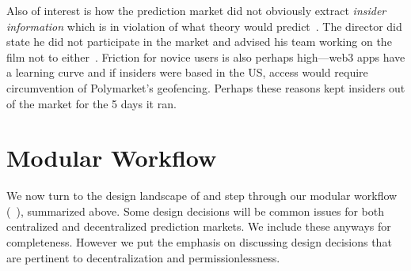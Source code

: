 Also of interest is how the prediction market did not obviously extract \textit{insider information} which is in violation of what theory would predict~\cite{Han07}. The director did state he did not participate in the market and advised his team working on the film not to either~\cite{Beg24}. Friction for novice users is also perhaps high---web3 apps have a learning curve and if insiders were based in the US, access would require circumvention of Polymarket's geofencing. Perhaps these reasons kept insiders out of the market for the 5 days it ran.


\section{Modular Workflow}
\label{sec:wf}

\begin{center}
\end{center}


We now turn to the design landscape of \depms and step through our modular workflow (\cf~\cite{ClEsGS21}), summarized above. Some design decisions will be common issues for both centralized and decentralized prediction markets. We include these anyways for completeness. However we put the emphasis on discussing design decisions that are pertinent to decentralization and permissionlessness.


